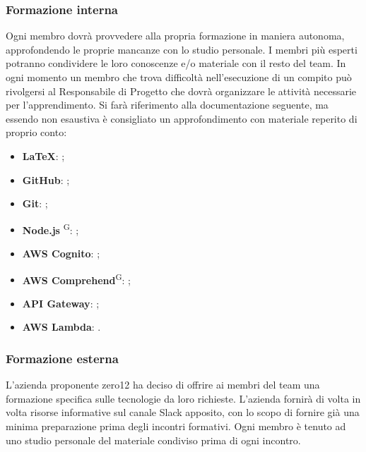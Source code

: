 \subsubsection{Formazione interna}
Ogni membro dovrà provvedere alla propria formazione in maniera autonoma, approfondendo le proprie mancanze con lo studio personale. I membri più esperti potranno condividere le loro conoscenze e/o materiale con il resto del team. In ogni momento un membro che trova difficoltà nell'esecuzione di un compito può rivolgersi al Responsabile di Progetto che dovrà organizzare le attività necessarie per l'apprendimento. Si farà riferimento alla documentazione seguente, ma essendo non esaustiva è consigliato un approfondimento con materiale reperito di proprio conto:
\begin{itemize}
\item \textbf{\LaTeX}: ;
\item \textbf{GitHub}: ;
\item \textbf{Git}: ;
\item \textbf{Node.js} \textsuperscript{G}: ;
\item \textbf{AWS Cognito}: ;
\item \textbf{AWS Comprehend}\textsuperscript{G}: ;
\item \textbf{API Gateway}: ;
\item \textbf{AWS Lambda}: .
\end{itemize}

\subsubsection{Formazione esterna}
L'azienda proponente zero12 ha deciso di offrire ai membri del team una formazione specifica sulle tecnologie da loro richieste. L'azienda fornirà di volta in volta risorse informative sul canale Slack apposito, con lo scopo di fornire già una minima preparazione prima degli incontri formativi. Ogni membro è tenuto ad uno studio personale del materiale condiviso prima di ogni incontro.


